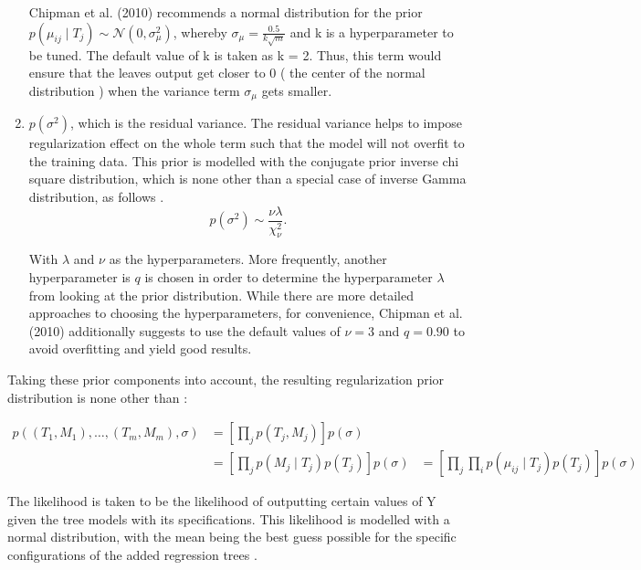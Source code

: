 \documentclass{usiinftr}
\begin{document}
\begin{enumerate}
Chipman et al. (2010) \cite{7} recommends a normal distribution for the prior $p( \mu_{ij} \mid T_j) \sim \mathcal{N}(0, \sigma^2_{ \mu })$, whereby $ \sigma_{ \mu } = \frac{0.5}{k \sqrt{m}}$  and k is a hyperparameter to be tuned. The default value of k is taken as k = 2. Thus, this term would ensure that the leaves output get closer to 0 ( the center of the normal distribution ) when the variance term $\sigma_{ \mu}$ gets smaller.
\item $p(\sigma^2)$, which is the residual variance. The residual variance helps to impose regularization effect on the whole term such that the model will not overfit to the training data. This prior is modelled with the conjugate prior inverse chi square distribution, which is none other than a special case of inverse Gamma distribution, as follows \cite{7}.
\begin{equation}p(\sigma^2) \sim \frac{\nu \lambda}{\chi_{\nu}^2}. \end{equation}

With $\lambda$ and $\nu$ as the hyperparameters. More frequently, another hyperparameter is $q$ is chosen in order to determine the hyperparameter $\lambda$ from looking at the prior distribution. While there are more detailed approaches to choosing the hyperparameters, for convenience, Chipman et al. (2010) \cite{7} additionally suggests to use the default values of $\nu = 3$ and $q = 0.90$ to avoid overfitting and yield good results.
\end{enumerate}

Taking these prior components into account, the resulting regularization prior distribution is none other 
than \cite{7}:

\begin{equation}
\begin{aligned}
p\left(\left(T_{1}, M_{1}\right), \ldots,\left(T_{m}, M_{m}\right), \sigma\right) &=\left[\prod_{j} p\left(T_{j}, M_{j}\right)\right] p(\sigma) \\
&=\left[\prod_{j} p\left(M_{j} \mid T_{j}\right) p\left(T_{j}\right)\right] p(\sigma)
&= \left[\prod_{j}  \prod_{i} p\left(\mu_{i j} \mid T_{j}\right) p\left(T_{j}\right)\right] p(\sigma)
\end{aligned}
\end{equation}

The likelihood is taken to be the likelihood of outputting certain values of Y given the tree models with its specifications. This likelihood is modelled with a normal distribution, with the mean being the best guess possible for the specific configurations of the added regression trees \cite{7}.
\end{document}
